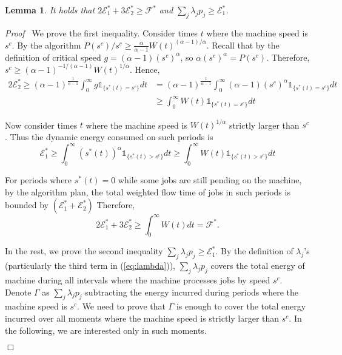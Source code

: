 \documentclass[11pt]{article}
\newenvironment{proof}{\noindent\emph{Proof\ }}{\hspace*{\fill}$\Box$\medskip}
\newtheorem{lemma}{Lemma}
\newcommand{\one}{\ensuremath{\mathds{1}}}
\begin{document}
\begin{lemma}		\label{lem:general-energy-lambda}
It holds that
$
2\mathcal{E}^{*}_{1} + 3\mathcal{E}^{*}_{2}
	\geq  \mathcal{F}^{*} 
$
and
$
\sum_{j} \lambda_{j}p_{j} \geq \mathcal{E}^{*}_{1} 
$.
\end{lemma}
\begin{proof}
We prove the first inequality.
Consider times $t$ where the machine speed is $ s^{c}$.   
By the algorithm $P(s^{c})/s^{c} \geq \frac{\alpha}{\alpha-1}W(t)^{(\alpha-1)/\alpha}$.
Recall that by the definition of critical speed $g = (\alpha-1)(s^{c})^{\alpha}$,
so $\alpha (s^{c})^{\alpha} = P(s^{c})$. Therefore,
$s^{c} \geq (\alpha-1)^{-1/(\alpha-1)} W(t)^{1/\alpha}$. Hence,
\begin{align*}
2 \mathcal{E}^{*}_{2} \geq (\alpha - 1)^{\frac{1}{\alpha-1}} \int_{0}^{\infty} g \one_{\{s^{*}(t) = s^{c}\}} dt 
	 &=(\alpha - 1)^{\frac{1}{\alpha-1}} 
		\int_{0}^{\infty} (\alpha - 1) (s^{c})^{\alpha} \one_{\{s^{*}(t) = s^{c}\}}dt \\
&\geq \int_{0}^{\infty} W(t) \one_{\{s^{*}(t) = s^{c}\}}dt
\end{align*}

Now consider times $t$ where the machine speed is $ W(t)^{1/\alpha}$
strictly larger than $ s^{c}$. Thus
the dynamic energy consumed on such periods is
$$
\mathcal{E}^{*}_{1} \geq \int_{0}^{\infty}(s^{*}(t))^{\alpha} \one_{\{s^{*}(t) > s^{c}\}}dt 
\geq \int_{0}^{\infty}  W(t) \one_{\{s^{*}(t) > s^{c}\}}dt 
$$

For periods where $s^{*}(t) = 0$ while some jobs are still pending
on the machine, by the algorithm plan, the total weighted flow time of jobs in such periods 
is bounded by $(\mathcal{E}^{*}_{1} + \mathcal{E}^{*}_{2})$
Therefore,
$$
2\mathcal{E}^{*}_{1} + 3\mathcal{E}^{*}_{2}
	\geq   \int_{0}^{\infty} W(t) dt
	=  \mathcal{F}^{*}. 
$$


In the rest, we prove the second inequality $\sum_{j} \lambda_{j}p_{j} \geq \mathcal{E}^{*}_{1}$.
By the definition of $\lambda_{j}$'s (particularly the third term in (\ref{eq:lambda})),
$\sum_{j} \lambda_{j}p_{j}$ covers the total energy of machine during all intervals where 
the machine processes jobs by speed $s^{c}$. Denote $\Gamma$ as 
$\sum_{j} \lambda_{j}p_{j}$ subtracting the energy incurred during periods where the machine 
speed is $s^{c}$. We need to prove that $\Gamma$  is enough to cover the total energy 
incurred over all moments where the machine speed is strictly larger than $s^{c}$.  
In the following, we are interested only in such moments.


\end{proof}
\end{document}
